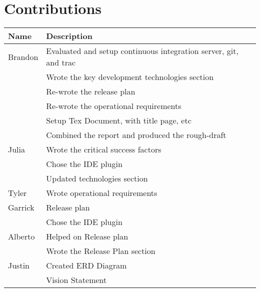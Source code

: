\section{Contributions}
\begin{tabular}{| l | l |}
\hline
Name & Description \\
\hline
Brandon & Evaluated and setup continuous integration server, git, and trac\\
 & Wrote the key development technologies section \\
 & Re-wrote the release plan \\
 & Re-wrote the operational requirements \\
 & Setup Tex Document, with title page, etc \\
 & Combined the report and produced the rough-draft \\
\hline
Julia & Wrote the critical success factors \\
 & Chose the IDE plugin \\
 & Updated technologies section\\
\hline
Tyler & Wrote operational requirements \\
\hline
Garrick & Release plan \\
 & Chose the IDE plugin \\
\hline
Alberto & Helped on Release plan  \\
& Wrote the Release Plan section \\
\hline
Justin & Created ERD Diagram \\
& Vision Statement \\
\hline
\end{tabular}
